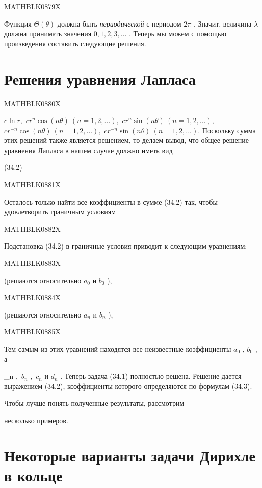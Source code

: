 \documentclass[
  ukrainian,
]{article}
\begin{document}
MATHBLK0879X

Функция \(\Theta(\theta)\) должна быть \emph{периодической} с периодом
\(2\pi\) . Значит, величина \(\lambda\) должна принимать значения
\(0, 1, 2, 3, \ldots\) . Теперь мы можем с помощью произведения
составить следующие решения.

\section{Решения уравнения
Лапласа}\label{ux440ux435ux448ux435ux43dux438ux44f-ux443ux440ux430ux432ux43dux435ux43dux438ux44f-ux43bux430ux43fux43bux430ux441ux430-1}

MATHBLK0880X

\(c \ln r,\) \(cr^n \cos(n\theta) \ (n = 1, 2, ...),\)
\(cr^n \sin(n\theta) \ (n = 1, 2, ...),\)
\(cr^{-n} \cos(n\theta) \ (n = 1, 2, ...),\)
\(cr^{-n} \sin(n\theta) \ (n = 1, 2, ...).\) Поскольку сумма этих
решений также является решением, то делаем вывод, что общее решение
уравнения Лапласа в нашем случае должно иметь вид

(34.2)

MATHBLK0881X

Осталось только найти все коэффициенты в сумме (34.2) так, чтобы
удовлетворить граничным условиям

MATHBLK0882X

Подстановка (34.2) в граничные условия приводит к следующим уравнениям:

MATHBLK0883X

(решаются относительно \(a_0\) и \(b_0\) ),

MATHBLK0884X

(решаются относительно \(a_n\) и \(b_n\) ),

MATHBLK0885X

Тем самым из этих уравнений находятся все неизвестные коэффициенты
\(a_0\) , \(b_0\) , а

\_n \(,\) \(b_n\) \(,\) \(c_n\) \(и\) \(d_n\) . Теперь задача (34.1)
полностью решена. Решение дается выражением (34.2), коэффициенты
которого определяются по формулам (34.3).

Чтобы лучше понять полученные результаты, рассмотрим

несколько примеров.

\section{Некоторые варианты задачи Дирихле в
кольце}\label{ux43dux435ux43aux43eux442ux43eux440ux44bux435-ux432ux430ux440ux438ux430ux43dux442ux44b-ux437ux430ux434ux430ux447ux438-ux434ux438ux440ux438ux445ux43bux435-ux432-ux43aux43eux43bux44cux446ux435-1}
\end{document}
